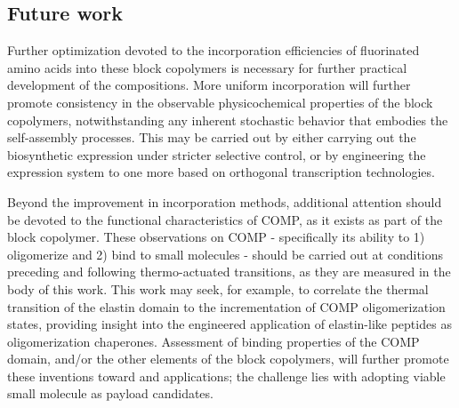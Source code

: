 \begin{refsection}
\subsection{Future work}

Further optimization devoted to the incorporation efficiencies of fluorinated
amino acids into these block copolymers is necessary for further practical
development of the compositions. More uniform incorporation will further promote
consistency in the observable physicochemical properties of the block
copolymers, notwithstanding any inherent stochastic behavior that embodies the
self-assembly processes. This may be carried out by either carrying out the
biosynthetic expression under stricter selective control, or by engineering the
expression system to one more based on orthogonal transcription technologies.

Beyond the improvement in incorporation methods, additional attention should be
devoted to the functional characteristics of COMP, as it exists as part of the
block copolymer. These observations on COMP - specifically its ability to 1)
oligomerize and 2) bind to small molecules - should be carried out at conditions
preceding and following thermo-actuated transitions, as they are measured in the
body of this work. This work may seek, for example, to correlate the thermal
transition of the elastin domain to the incrementation of COMP oligomerization
states, providing insight into the engineered application of elastin-like
peptides as oligomerization chaperones. Assessment of binding properties of the
COMP domain, and/or the other elements of the block copolymers, will further
promote these inventions toward  and 
applications; the challenge lies with adopting viable small molecule as payload
candidates.


\end{refsection}
